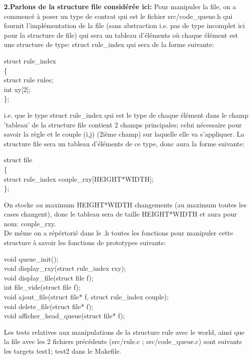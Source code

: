 \documentclass{article}
\begin{document}
{{{        \textbf{2.Parlons de la structure file considérée ici: \newline}
        Pour manipuler la file, on a commencé à poser un type de contrat qui est le fichier src/code\_queue.h qui fournit l'implémentation de la file (sans abstraction i.e. pas de type incomplet ici pour la structure de file) qui sera un tableau d'éléments où chaque élément est une structure de type: struct rule\_index qui sera de la forme suivante:
        \begin{center}
         struct rule\_index \\ \{ \\
         struct rule rules; \\
         int xy[2]; \\
         \};\\
        \end{center}
        i.e. que le type struct rule\_index qui est le type de chaque élément dans le champ 'tableau' de la structure file contient 2 champs principales; celui nécessaire pour savoir la règle et le couple (i,j) (2ième champ) sur laquelle elle va s'appliquer. La structure file sera un tableau d'éléments de ce type, donc aura la forme suivante:\\
        \begin{center}
        struct file \\ \{ \\
        struct rule\_index couple\_rxy[HEIGHT*WIDTH];\\
        \}; \\
        \end{center}
        On stocke au maximum HEIGHT*WIDTH changements (au maximum toutes les cases changent), donc le tableau sera de taille HEIGHT*WIDTH et aura pour nom: couple\_rxy.\\
        De même on a répértorié dans le .h toutes les fonctions pour manipuler cette structure à savoir les fonctions de prototypes suivants:\\
        \begin{center}
        void queue\_init();\\
        void display\_rxy(struct rule\_index rxy);\\
        void display\_file(struct file f);\\
        int file\_vide(struct file f);\\
        void ajout\_file(struct file* f, struct rule\_index couple);\\
        void delete\_file(struct file* f);\\
        void afficher\_head\_queue(struct file* f);\\
        \end{center}
        Les tests relatives aux manipulations de la structure rule avec le world, ainsi que la file avec les 2 fichiers précédents (src/rule.c ; src/code\_queue.c) sont suivants les targets test1; test2 dans le Makefile.
        }
        
}}
\end{document}
